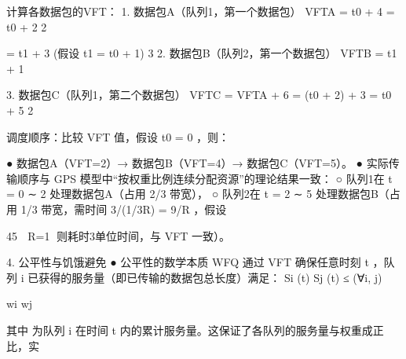 计算各数据包的VFT：
 1. 数据包A（队列1，第一个数据包） VFTA = t0 +
                                     4
                                       = t0 + 2
                                     2
                                                                                      ​       ​                       ​           ​




                                       = t1 + 3 (假设 t1 = t0 + 1)
                                    3
 2. 数据包B（队列2，第一个数据包） VFTB = t1 +
                                    1
                                                                                  ​       ​                       ​           ​                           ​       ​




 3. 数据包C（队列1，第二个数据包） VFTC = VFTA +
                                        6
                                           = (t0 + 2) + 3 = t0 + 5
                                        2
                                                                              ​                       ​                   ​                   ​               ​




调度顺序：比较 VFT 值，假设 t0 = 0 ，则：                           ​




 ● 数据包A（VFT=2）→ 数据包B（VFT=4）→ 数据包C（VFT=5）。
 ● 实际传输顺序与 GPS 模型中“按权重比例连续分配资源”的理论结果一致：
     ○ 队列1在 t = 0 ∼ 2 处理数据包A（占用 2/3 带宽），
     ○ 队列2在 t = 2 ∼ 5 处理数据包B（占用 1/3 带宽，需时间 3/(1/3R) = 9/R ，假设



                                                                                                                                                                      45
           R=1         ，则耗时3单位时间，与 VFT 一致）。

4. 公平性与饥饿避免
 ●   公平性的数学本质
     WFQ 通过 VFT 确保任意时刻 t ，队列 i 已获得的服务量（即已传输的数据包总长度）满足：
     Si (t)    Sj (t)
            ≤                      (∀i, j)
       ​               ​




      wi         wj
               ​               ​




   其中     为队列 i 在时间 t 内的累计服务量。这保证了各队列的服务量与权重成正比，实
           ​               ​




